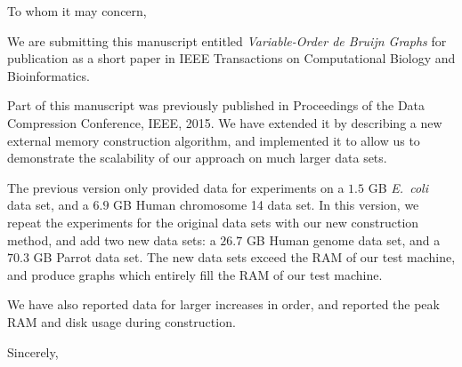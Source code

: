 \documentclass{letter}
\makeatletter
\renewcommand{\closing}[1]{\par\nobreak\vspace{\parskip}%
  \stopbreaks
  \noindent
  \ifx\@empty\fromaddress\else
  \hspace*{\longindentation}\fi
  \parbox{\indentedwidth}{\raggedright
       \ignorespaces #1\\[3\medskipamount]%
       \ifx\@empty\fromsig
           \fromname
       \else \fromsig \fi\strut}%
   \par}
\makeatother
\begin{document}
\begin{letter}{} %
\opening{To whom it may concern,}

We are submitting this manuscript entitled \textit{Variable-Order de Bruijn Graphs}
for publication as a short paper in IEEE Transactions on Computational Biology
and Bioinformatics.

Part of this manuscript was previously published in Proceedings of the Data Compression
Conference, IEEE, 2015. We have extended it by describing a new external memory construction
algorithm, and implemented it to allow us to demonstrate the scalability of
our approach on much larger data sets.

The previous version only provided data for experiments on a $1.5$ GB {\em E.~coli} data set,
and a $6.9$ GB Human chromosome 14 data set. In this version, we repeat the experiments for
the original data sets with our new construction method, and add two new data sets: a $26.7$ GB
Human genome data set, and a $70.3$ GB Parrot data set. The new data sets exceed the RAM of
our test machine, and produce graphs which entirely fill the RAM of our test machine.

We have also reported data for larger increases in order, and reported the peak RAM and disk usage
during construction.

\closing{Sincerely,}
\end{letter}
\end{document}
